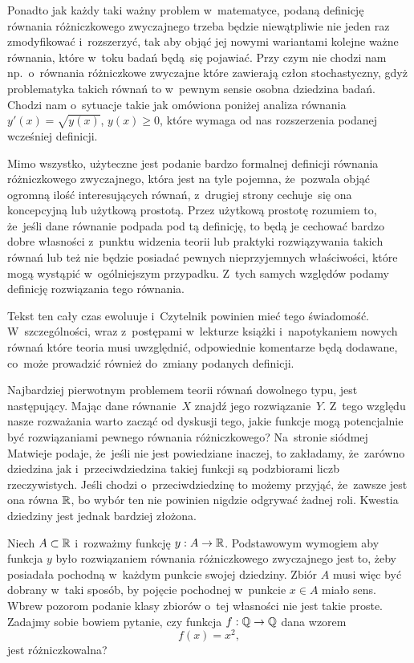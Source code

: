 \documentclass[a4paper,11pt]{article}
\numberwithin{equation}{section}
\begin{document}
Ponadto jak każdy taki ważny problem w~matematyce, podaną definicję
równania różniczkowego zwyczajnego trzeba będzie niewątpliwie nie jeden raz
zmodyfikować i~rozszerzyć, tak aby objąć jej nowymi wariantami kolejne ważne
równania, które w~toku badań będą~się
pojawiać. Przy czym nie chodzi nam np.~o~równania różniczkowe zwyczajne
które
zawierają człon stochastyczny, gdyż problematyka takich równań to w~pewnym
sensie osobna dziedzina badań. Chodzi nam o~sytuacje takie jak omówiona
poniżej analiza równania $y'( x ) = \sqrt{ y( x ) }$, $y( x ) \geq 0$, które
wymaga od nas rozszerzenia podanej wcześniej definicji.

Mimo wszystko, użyteczne jest podanie bardzo formalnej definicji równania
różniczkowego zwyczajnego, która jest na tyle pojemna, że~pozwala objąć
ogromną ilość interesujących równań, z~drugiej strony cechuje~się ona
koncepcyjną lub użytkową prostotą. Przez użytkową prostotę rozumiem to,
że~jeśli dane równanie podpada pod tą definicję, to będą je
cechować bardzo dobre własności z~punktu widzenia teorii lub praktyki
rozwiązywania takich równań lub też nie będzie posiadać pewnych
nieprzyjemnych
właściwości, które mogą wystąpić w~ogólniejszym przypadku. Z~tych samych
względów podamy definicję rozwiązania tego równania.

Tekst ten cały czas ewoluuje i~Czytelnik powinien mieć tego świadomość.
W~szczególności, wraz z~postępami w~lekturze książki i~napotykaniem nowych
równań które teoria musi uwzględnić, odpowiednie komentarze będą dodawane,
co~może prowadzić również do~zmiany podanych definicji.

Najbardziej pierwotnym problemem teorii równań dowolnego typu, jest
następujący. Mając dane równanie~$X$ znajdź jego rozwiązanie~$Y$. Z~tego
względu nasze rozważania warto zacząć od dyskusji tego, jakie funkcje mogą
potencjalnie być rozwiązaniami pewnego równania różniczkowego? Na~stronie
siódmej Matwieje podaje, że~jeśli nie jest powiedziane inaczej, to zakładamy,
że~zarówno dziedzina jak i~przeciwdziedzina takiej funkcji są podzbiorami
liczb rzeczywistych. Jeśli chodzi o~przeciwdziedzinę to możemy przyjąć,
że~zawsze jest ona równa $\mathbb{R}$, bo wybór ten nie powinien nigdzie odgrywać
żadnej roli. Kwestia dziedziny jest jednak bardziej złożona.

Niech $A \subset \mathbb{R}$ i~rozważmy funkcję $y : A \to \mathbb{R}$. Podstawowym wymogiem aby
funkcja $y$ było rozwiązaniem równania różniczkowego zwyczajnego jest to,
żeby posiadała pochodną w~każdym punkcie swojej dziedziny. Zbiór $A$ musi
więc być dobrany w~taki sposób, by pojęcie pochodnej w~punkcie $x \in A$
miało
sens. Wbrew pozorom podanie klasy zbiorów o~tej własności nie jest takie
proste. Zadajmy sobie bowiem pytanie, czy funkcja $f : \mathbb{Q} \to \mathbb{Q}$ dana
wzorem
\begin{equation}
  \label{eq:Czym-jest-rownanie-ETC-01}
  f( x ) = x^{ 2 },
\end{equation}
jest różniczkowalna?
\end{document}
